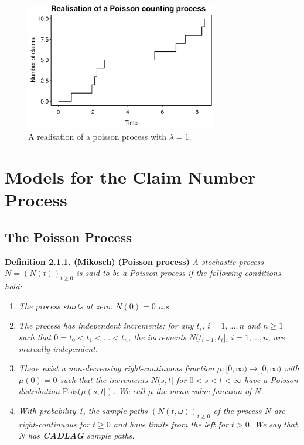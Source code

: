 \documentclass[a4paper,10pt,openany]{book}
\providecommand{\tightlist}{%
 \setlength{\itemsep}{0pt}\setlength{\parskip}{0pt}}
\begin{document}
\begin{figure}[H]
  \begin{center}
    \includegraphics[width=0.75\textwidth]{figures/skade1_plot1.png}
  \end{center}
  \caption{A realisation of a poisson process with $\lambda = 1$.}
\end{figure}

\hypertarget{models-for-the-claim-number-process}{%
\section{Models for the Claim Number Process}\label{models-for-the-claim-number-process}}

\hypertarget{the-poisson-process}{%
\subsection{The Poisson Process}\label{the-poisson-process}}

\textbf{Definition 2.1.1. (Mikosch) (Poisson process)} \emph{A stochastic process \(N=(N(t))_{t\ge 0}\) is said to be a Poisson process if the following conditions hold:}

\begin{enumerate}
\def\labelenumi{(\arabic{enumi})}
\tightlist
\item
  \emph{The process starts at zero: \(N(0)=0\) a.s.}
\item
  \emph{The process has independent increments: for any \(t_i\), \(i=1,...,n\) and \(n\ge 1\) such that \(0=t_0<t_1<...<t_n\), the increments \(N(t_{i-1},t_i]\), \(i=1,...,n\), are mutually independent.}
\item
  \emph{There exist a non-decreasing right-continuous function \(\mu : [0,\infty)\to [0,\infty)\) with \(\mu(0)=0\) such that the increments \(N(s,t]\) for \(0<s<t<\infty\) have a Poisson distribution \(\text{Pois}(\mu(s,t])\). We call \(\mu\) the mean value function of \(N\).}
\item
  \emph{With probability 1, the sample paths \((N(t,\omega))_{t\ge 0}\) of the process \(N\) are right-continuous for \(t \ge 0\) and have limits from the left for \(t > 0\). We say that \(N\) has \textbf{CADLAG} sample paths.}
\end{enumerate}
\end{document}
